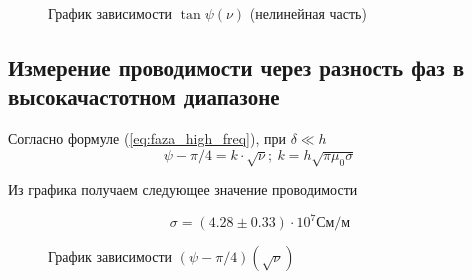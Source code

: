 \documentclass{article}
\begin{document}
\begin{figure}[h]
    \caption{График зависимости $\tan \psi (\nu)$ (нелинейная часть)}\label{fig:tg_psi_nu_no_line}
    \newpage
\end{figure}

\subsection{Измерение проводимости через разность фаз в высокачастотном диапазоне}
Согласно формуле (\ref{eq:faza_high_freq}), при $\delta \ll h$
\begin{equation*}
    \psi - \pi/4 = k\cdot \sqrt{\nu}; \ k = h\sqrt{\pi\mu_0\sigma}
\end{equation*}

Из графика получаем следующее значение проводимости

\begin{equation}
    \sigma = (4.28 \pm 0.33) \cdot 10^7 См/м
\end{equation}

\newpage

\begin{figure}[h]
    \caption{График зависимости $(\psi - \pi/4)(\sqrt{\nu})$}\label{fig:psi_sqrt_nu}
    \newpage
\end{figure}
\end{document}
